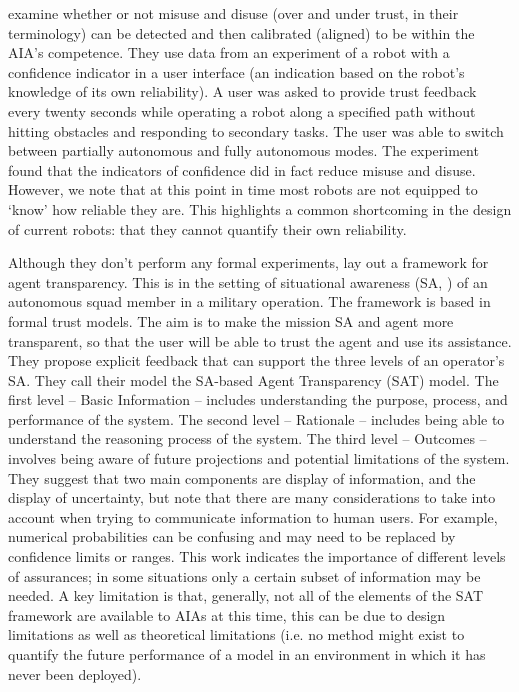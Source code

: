 \citet{Kaniarasu2013-ho} examine whether or not misuse and disuse (over and under trust, in their terminology) can be detected and then calibrated (aligned) to be within the AIA's competence. They use data from an experiment of a robot with a confidence indicator in a user interface (an indication based on the robot's knowledge of its own reliability). A user was asked to provide trust feedback every twenty seconds while operating a robot along a specified path without hitting obstacles and responding to secondary tasks. The user was able to switch between partially autonomous and fully autonomous modes. The experiment found that the indicators of confidence did in fact reduce misuse and disuse. However, we note that at this point in time most robots are not equipped to `know' how reliable they are. This highlights a common shortcoming in the design of current robots: that they cannot quantify their own reliability.

Although they don't perform any formal experiments, \citet{Chen2014-dk} lay out a framework for agent transparency. This is in the setting of situational awareness (SA, \cite{Endsley1995-ie}) of an autonomous squad member in a military operation. The framework is based in formal trust models. The aim is to make the mission SA and agent more transparent, so that the user will be able to trust the agent and use its assistance. They propose explicit feedback that can support the three levels of an operator's SA. They call their model the SA-based Agent Transparency (SAT) model. The first level -- Basic Information -- includes understanding the purpose, process, and performance of the system. The second level -- Rationale -- includes being able to understand the reasoning process of the system. The third level -- Outcomes -- involves being aware of future projections and potential limitations of the system. They suggest that two main components are display of information, and the display of uncertainty, but note that there are many considerations to take into account when trying to communicate information to human users. For example, numerical probabilities can be confusing and may need to be replaced by confidence limits or ranges. This work indicates the importance of different levels of assurances; in some situations only a certain subset of information may be needed. A key limitation is that, generally, not all of the elements of the SAT framework are available to AIAs at this time, this can be due to design limitations as well as theoretical limitations (i.e. no method might exist to quantify the future performance of a model in an environment in which it has never been deployed).

